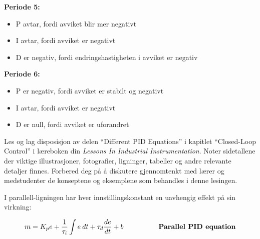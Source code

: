 {\bf Periode 5:}

\begin{itemize}
\item{}P avtar, fordi avviket blir mer negativt
\item{}I avtar, fordi avviket er negativt
\item{}D er negativ, fordi endringshastigheten i avviket er negativ
\end{itemize}
\bigskip



{\bf Periode 6:}

\begin{itemize}
\item{}P er negativ, fordi avviket er stabilt og negativt
\item{}I avtar, fordi avviket er negativt
\item{}D er null, fordi avviket er uforandret
\end{itemize}





Les og lag disposisjon av delen ``Different PID Equations'' i kapitlet ``Closed-Loop Control'' i læreboken din {\it Lessons In Industrial Instrumentation}. Noter sidetallene der viktige illustrasjoner, fotografier, ligninger, tabeller og andre relevante detaljer finnes. Forbered deg på å diskutere gjennomtenkt med lærer og medstudenter de konseptene og eksemplene som behandles i denne lesingen.














I parallell-ligningen har hver innstillingskonstant en uavhengig effekt på sin virkning:

$$m = K_p e + {1 \over \tau_i} \int e \> dt + \tau_d {de \over dt} + b \hbox{\hskip 50pt {\bf Parallel PID equation}}$$


